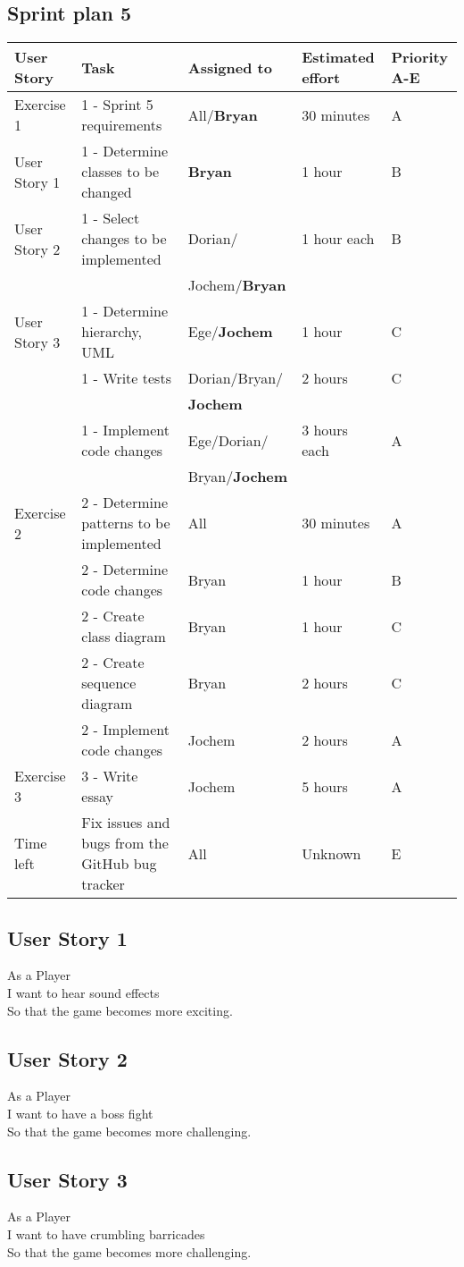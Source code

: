 \documentclass[10pt]{article}
\begin{document}
\begin{center}

\section*{Sprint plan 5}

    \hspace*{-3cm}\begin{tabular}{ | p{2cm} | p{9cm} | p{2.3cm} | p{2cm} | p{2cm} |}
    \hline
    User Story & Task & Assigned to & Estimated effort & Priority A-E \\ \hline
    Exercise 1 & 1 - Sprint 5 requirements & All/\textbf{Bryan} & 30 minutes & A\\ 
    User Story 1 & 1 - Determine classes to be changed & \textbf{Bryan} & 1 hour & B\\
    User Story 2 & 1 - Select changes to be implemented & Dorian/ & 1 hour each & B\\ 
    & & Jochem/\textbf{Bryan} & &\\
    User Story 3 & 1 - Determine hierarchy, UML & Ege/\textbf{Jochem} & 1 hour & C\\ 
    & 1 - Write tests & Dorian/Bryan/  & 2 hours & C\\
    & & \textbf{Jochem} & &\\
    & 1 - Implement code changes & Ege/Dorian/ & 3 hours each& A\\ 
    & & Bryan/\textbf{Jochem} & &\\
    Exercise 2 & 2 - Determine patterns to be implemented & All & 30 minutes & A\\ 
    & 2 - Determine code changes & Bryan & 1 hour & B\\
    & 2 - Create class diagram & Bryan & 1 hour & C\\ 
    & 2 - Create sequence diagram & Bryan & 2 hours & C\\ 
    & 2 - Implement code changes & Jochem & 2 hours & A \\ \hline    
    Exercise 3 & 3 - Write essay & Jochem & 5 hours & A\\
    Time left & Fix issues and bugs from the GitHub bug tracker & All & Unknown & E\\ \hline          
    \end{tabular}
    
\end{center}

\subsection*{User Story 1}
As a Player\\ 
\indent I want to hear sound effects\\
So that the game becomes more exciting.

\subsection*{User Story 2}
As a Player\\ 
\indent I want to have a boss fight\\
So that the game becomes more challenging.

\subsection*{User Story 3}
As a Player\\ 
\indent I want to have crumbling barricades\\
So that the game becomes more challenging.
\end{document}
